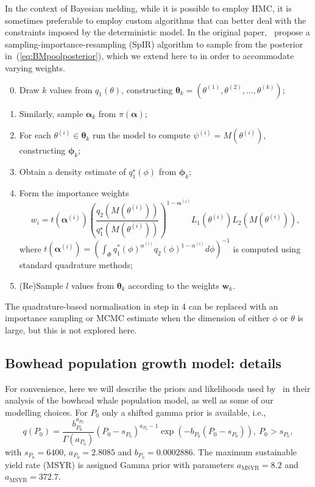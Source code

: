 \documentclass[12pt]{article}
\begin{document}
In the context of Bayesian melding, while it is possible to employ HMC, it is sometimes preferable to employ custom algorithms that can better deal with the constraints imposed by the deterministic model.
In the original paper,~\textcite[sec. 3.4]{Poole2000} propose a sampling-importance-resampling (SpIR) algorithm to sample from the posterior in~(\ref{eq:BMpoolposterior}), which we extend here to in order to accommodate varying weights.
\begin{enumerate}
\setcounter{enumi}{-1}
 \item Draw $k$ values from  $q_1(\theta)$, constructing $\boldsymbol \theta_k = (\theta^{(1)}, \theta^{(2)}, \ldots, \theta^{(k)} )$;
 \item Similarly, sample $\boldsymbol \alpha_k$ from $\pi(\boldsymbol \alpha)$;
 \item For each $\theta^{(i)} \in \boldsymbol\theta_k$ run the model to compute $\psi^{(i)} = M(\theta^{(i)})$, constructing $\boldsymbol \phi_k$;
 \item Obtain a density estimate of $q_1^\star(\phi)$ from  $\boldsymbol \phi_k$;
 \item Form the importance weights 
 \begin{equation}
 \label{eq:SpIRweights}
  w_i = t\left(\boldsymbol \alpha^{(i)}\right) \left(\frac{q_2(M(\theta^{(i)}))}{q_1^\star(M(\theta^{(i)}))}\right)^{1 - \boldsymbol \alpha^{(i)}} L_1(\theta^{(i)}) L_2(M(\theta^{(i)})),
 \end{equation}
where $t\left(\boldsymbol \alpha^{(i)}\right) = \left( \int_{\Phi} q_1^\ast(\phi)^{\alpha^{(i)}} q_2(\phi)^{1-\alpha^{(i)}} d\phi \right)^{-1}$ is computed using standard quadrature methods;
 \item (Re)Sample $l$ values from $\boldsymbol \theta_k$ according to the weights $\boldsymbol w_k$.
\end{enumerate}
The quadrature-based normalisation in step in 4 can be replaced with an importance sampling or MCMC estimate when the dimension of either $\phi$ or $\theta$ is large, but this is not explored here.


\newpage
\subsection{Bowhead population growth model: details}
\label{sec:appendix_bowhead}

For convenience, here we will describe the priors and likelihoods used by~\textcite{Poole2000} in their analysis of the bowhead whale population model, as well as some of our modelling choices.
For $P_0$ only a shifted gamma prior is available, i.e.,
\begin{equation*}
 q(P_0) = \frac{b_{P_0}^{a_{P_0}}}{\Gamma(a_{P_0})} (P_0 - s_{P_0})^{a_{P_0}-1} \exp\left(-b_{P_0}(P_0 - s_{P_0})\right), \: P_0 > s_{P_0},
\end{equation*}
with $s_{P_0} = 6400$, $a_{P_0} = 2.8085$ and $b_{P_0} = 0.0002886$.
The maximum sustainable yield rate (MSYR) is assigned Gamma prior with parameters $a_{\text{MSYR}} = 8.2$ and $a_{\text{MSYR}} = 372.7$.
\end{document}
